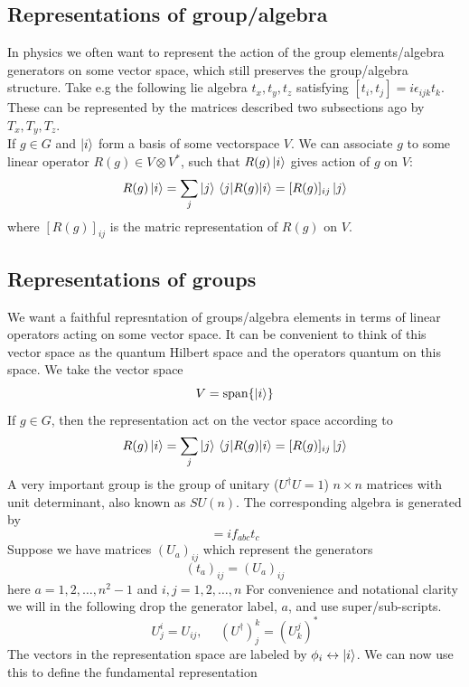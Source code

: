 \documentclass[a4paper,12pt]{article}
\begin{document}
\subsection{Representations of group/algebra}
In physics we often want to represent the action of the group elements/algebra generators on some vector space, which still preserves the group/algebra structure. Take e.g the following lie algebra $t_x,t_y,t_z$ satisfying $[t_i,t_j]=i\epsilon_{ijk}t_k$. These can be represented by the matrices described two subsections ago by $T_x,T_y,T_z$.  \\
If $g\in G$ and $\ket{i}$ form a basis of some vectorspace $V$. We can associate $g$ to some linear operator $R(g)\in V\otimes V^*$, such that $R(g)\ket{i}$ gives action of $g$ on $V$:
\begin{equation}
R(g)\ket{i}=\sum_j \ket{j}\mel{j}{R(g)}{i}=[R(g)]_{ij}\ket{j}
\end{equation}
where $[R(g)]_{ij}$ is the matric representation of $R(g)$ on $V$.
\subsection{Representations of groups}
We want a faithful represntation of groups/algebra elements in terms of linear operators acting on some vector space.
It can be convenient to think of this vector space as the quantum Hilbert space and the operators quantum on this space. We take the vector space
\begin{equation}
V= \text{span}\{\ket{i}\}
\end{equation}
If $g\in G$, then the representation act on the vector space according to
\begin{equation}
	R(g)\ket{i}=\sum_j \ket{j}\mel{j}{R(g)}{i}=[R(g)]_{ij}\ket{j}
\end{equation}
A very important group is the group of unitary ($U^\dagger U=1$) $n\times n$ matrices with unit determinant, also known as $SU(n)$. The corresponding algebra is generated by 
\begin{equation}
[t_a,t_b]=if_{abc}t_c
\end{equation}
Suppose we have matrices $(U_a)_{ij}$ which represent the generators
\begin{equation}
	(t_a)_{ij}=(U_a)_{ij}
\end{equation}
here $a=1,2,\dots,n^2-1$ and $i,j=1,2,\dots,n$
For convenience and notational clarity we will in the following drop the generator label, $a$, and use super/sub-scripts.
\begin{equation}
U^i_j=U_{ij},~~~~~~(U^\dagger)^k_j=(U_k^j)^*
\end{equation}
The vectors in the representation space are labeled by $\phi_i\leftrightarrow\ket{i}$. We can now use this to define the fundamental representation
\end{document}
